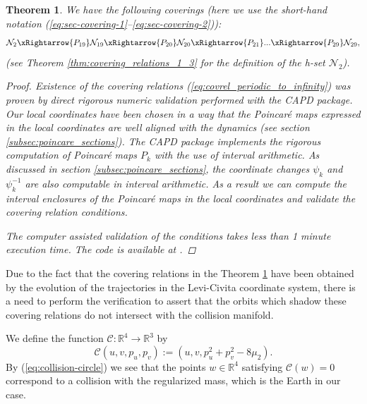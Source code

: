 \documentclass[1p]{article}
\newtheorem{theorem}{Theorem}
\begin{document}
\begin{theorem}
    \label{thm:covrel_periodic_to_infinity}
    We have the following coverings (here we use the short-hand notation (\ref{eq:sec-covering-1}--\ref{eq:sec-covering-2})):
    \begin{equation}
        \label{eq:covrel_periodic_to_infinity}
        \mathcal{N}_2 \xRightarrow{P_{19}} \mathcal{N}_{19} \xRightarrow{P_{20}} \mathcal{N}_{20} \xRightarrow{P_{21}} ... \xRightarrow{P_{29}} \mathcal{N}_{29},
    \end{equation}
    (see Theorem \ref{thm:covering_relations_1_3} for the definition of the h-set $\mathcal{N}_2$).
    \begin{proof}
        Existence of the covering relations (\ref{eq:covrel_periodic_to_infinity}) was proven by direct rigorous numeric validation performed with the CAPD package. Our local coordinates have been chosen in a way that the Poincar\'e maps expressed in the local coordinates are well aligned with the dynamics (see section \ref{subsec:poincare_sections}). The CAPD package implements the rigorous computation of Poincar\'e maps $P_{k}$ with the use of interval arithmetic. As discussed in section \ref{subsec:poincare_sections}, the coordinate changes $\psi_{k}$ and $\psi_{k}^{-1}$ are also computable in interval arithmetic. As a result we can compute the interval enclosures of the Poincar\'e maps in the local coordinates and validate the covering relation conditions.

        The computer assisted validation of the conditions takes less than 1 minute execution time. The code is available at \cite{pcr3bp_code}. 
    \end{proof}
\end{theorem}

Due to the fact that the covering relations in the Theorem \ref{thm:covrel_periodic_to_infinity} have been obtained by the evolution of the trajectories in the Levi-Civita coordinate system, there is a need to perform the verification to assert that the orbits which shadow these covering relations do not intersect with the collision manifold.

We define the function $\mathcal{C} : \mathbb{R}^4 \to \mathbb{R}^3$ by
\begin{equation}
    \label{eq:collision_set_condition}
    \mathcal{C} (u,v,p_u,p_v) := \left( u, v, p_u^2 + p_v^2 - 8\mu_2 \right).
\end{equation}
By (\ref{eq:collision-circle}) we see that the points $w \in \mathbb{R}^4$ satisfying $\mathcal{C}(w) = 0$ correspond to a collision with the regularized mass, which is the Earth in our case. 
\end{document}
